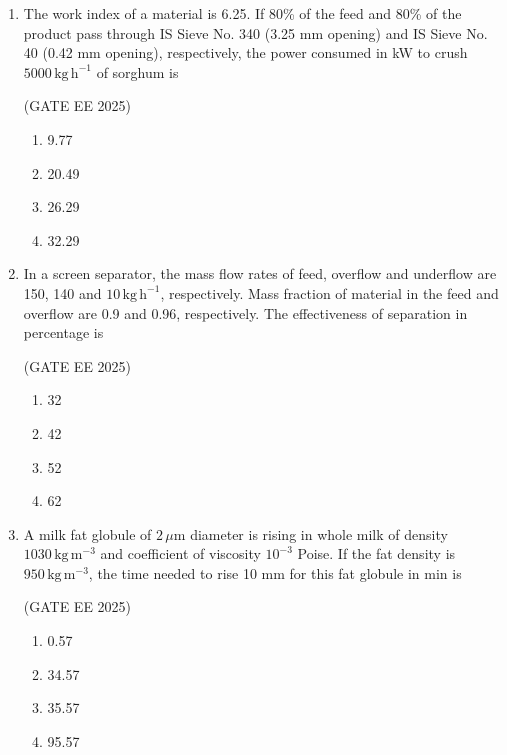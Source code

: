 \documentclass[journal,12pt,onecolumn]{IEEEtran}
\theoremstyle{remark}
\begin{document}
\begin{enumerate}
\item The work index of a material is 6.25. If 80\% of the feed and 80\% of the product pass through IS Sieve No. 340 (3.25 mm opening) and IS Sieve No. 40 (0.42 mm opening), respectively, the power consumed in kW to crush $5000\,\mathrm{kg\,h^{-1}}$ of sorghum is\

\hfill(GATE EE 2025)

\begin{multicols}{4}
    \begin{enumerate}
        \item 9.77
        \item 20.49
        \item 26.29
        \item 32.29
    \end{enumerate}
\end{multicols}

\item In a screen separator, the mass flow rates of feed, overflow and underflow are 150, 140 and $10\,\mathrm{kg\,h^{-1}}$, respectively. Mass fraction of material in the feed and overflow are 0.9 and 0.96, respectively. The effectiveness of separation in percentage is\

\hfill(GATE EE 2025)

\begin{multicols}{4}
    \begin{enumerate}
        \item 32
        \item 42
        \item 52
        \item 62
    \end{enumerate}
\end{multicols}

\item A milk fat globule of $2\,\mu\mathrm{m}$ diameter is rising in whole milk of density $1030\,\mathrm{kg\,m^{-3}}$ and coefficient of viscosity $10^{-3}$ Poise. If the fat density is $950\,\mathrm{kg\,m^{-3}}$, the time needed to rise 10 mm for this fat globule in min is\

\hfill(GATE EE 2025)

\begin{multicols}{4}
    \begin{enumerate}
        \item 0.57
        \item 34.57
        \item 35.57
        \item 95.57
    \end{enumerate}
\end{multicols}


\end{enumerate}
\end{document}
